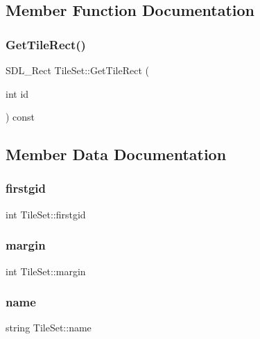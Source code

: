 \subsection{Member Function Documentation}
\mbox{\label{struct_tile_set_acc292ea3f186e73bbd238655e50abb77}} 
\subsubsection{\texorpdfstring{GetTileRect()}{GetTileRect()}}
{\footnotesize\ttfamily S\+D\+L\+\_\+\+Rect Tile\+Set\+::\+Get\+Tile\+Rect (\begin{DoxyParamCaption}\item[{int}]{id }\end{DoxyParamCaption}) const}



\subsection{Member Data Documentation}
\mbox{\label{struct_tile_set_a452d3781af06187d71e84a147c0b67eb}} 
\subsubsection{\texorpdfstring{firstgid}{firstgid}}
{\footnotesize\ttfamily int Tile\+Set\+::firstgid}

\mbox{\label{struct_tile_set_a55a34c405263221cc810131c50ad189f}} 
\subsubsection{\texorpdfstring{margin}{margin}}
{\footnotesize\ttfamily int Tile\+Set\+::margin}

\mbox{\label{struct_tile_set_abb4357754a4e050d86b4941c71f71b69}} 
\subsubsection{\texorpdfstring{name}{name}}
{\footnotesize\ttfamily string Tile\+Set\+::name}

